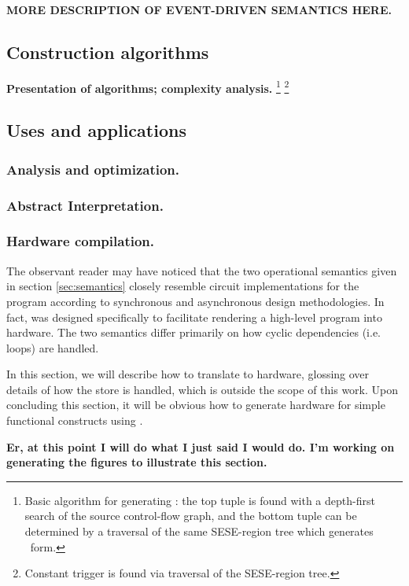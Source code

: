 \documentclass[12pt,titlepage,twoside]{article}
\begin{document}
\textbf{MORE DESCRIPTION OF EVENT-DRIVEN SEMANTICS HERE.}

\subsection{Construction algorithms}
\textbf{Presentation of algorithms; complexity analysis.}
\footnote{Basic algorithm for generating : the top
tuple is found with a depth-first search of the source
control-flow graph, and the bottom tuple can be determined by a
traversal of the same SESE-region tree which generates \ssizero\
form.}
\footnote{Constant trigger is found via traversal of the SESE-region tree.}

\subsection{Uses and applications}
\subsubsection{Analysis and optimization.}
\subsubsection{Abstract Interpretation.}
\subsubsection{Hardware compilation.}\label{sec:hardware}
The observant reader may have noticed that the two 
operational semantics given in section \ref{sec:semantics} closely
resemble circuit implementations for the program according to
synchronous and asynchronous design methodologies.  In fact,
\ssiplus{} was designed specifically to facilitate rendering a
high-level program into hardware.  The two semantics differ primarily
on how cyclic dependencies (i.e. loops) are handled.

In this section, we will describe how to translate \ssiplus{} to
hardware, glossing over details of how the store is handled, which is
outside the scope of this work.  Upon concluding this section, it will
be obvious how to generate hardware for simple functional constructs
using \ssiplus.

\textbf{Er, at this point I will do what I just said I would do.  I'm
working on generating the figures to illustrate this section.}%
\end{document}
